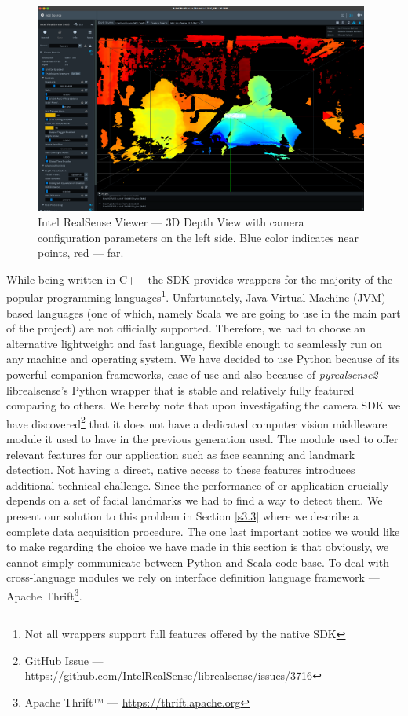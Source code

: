 \begin{figure}[ht!]
  \centering
  \includegraphics[width=0.98\textwidth]{Figures/Pictures/rsviewer.png}
  \caption{Intel RealSense Viewer — 3D Depth View with camera configuration parameters on the left side. Blue color indicates near points, red — far.}
  \label{f3r}
\end{figure}
While being written in C++ the SDK provides wrappers for the majority of the popular programming languages\footnote{Not all wrappers support full features offered by the native SDK}. Unfortunately, Java Virtual Machine (JVM) based languages (one of which, namely Scala we are going to use in the main part of the project) are not officially supported. Therefore, we had to choose an alternative lightweight and fast language, flexible enough to seamlessly run on any machine and operating system. We have decided to use Python because of its powerful companion frameworks, ease of use and also because of \textit{pyrealsense2} — librealsense's Python wrapper that is stable and relatively fully featured comparing to others. We hereby note that upon investigating the camera SDK we have discovered\footnote{GitHub Issue — \url{https://github.com/IntelRealSense/librealsense/issues/3716}} that it does not have a dedicated computer vision middleware module it used to have in the previous generation \cite{betschard2016} used. The module used to offer relevant features for our application such as face scanning and landmark detection. Not having a direct, native access to these features introduces additional technical challenge. Since the performance of or application crucially depends on a set of facial landmarks we had to find a way to detect them. We present our solution to this problem in Section \ref{s3.3} where we describe a complete data acquisition procedure. The one last important notice we would like to make regarding the choice we have made in this section is that obviously, we cannot simply communicate between Python and Scala code base. To deal with cross-language modules we rely on interface definition language framework — Apache Thrift\footnote{Apache Thrift™ — \url{https://thrift.apache.org}}.  

